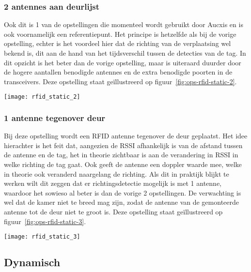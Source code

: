 \subsubsection{2 antennes aan deurlijst}
\begin{minipage}{0.65\textwidth}
Ook dit is 1 van de opstellingen die momenteel wordt gebruikt door Aucxis en is ook voornamelijk een referentiepunt. Het principe is hetzelfde als bij de vorige opstelling, echter is het voordeel hier dat de richting van de verplaatsing wel bekend is, dit aan de hand van het tijdsverschil tussen de detecties van de tag. In dit opzicht is het beter dan de vorige opstelling, maar is uiteraard duurder door de hogere aantallen benodigde antennes en de extra benodigde poorten in de transceivers. Deze opstelling staat geïllustreerd op figuur~\ref{fig:ops-rfid-static-2}.
\end{minipage}
\hfill
\begin{minipage}{0.30\textwidth}
	\texttt{[image: rfid\_static\_2]}
	\label{fig:ops-rfid-static-2}
\end{minipage}

\subsubsection{1 antenne tegenover deur}
\begin{minipage}{0.65\textwidth}
Bij deze opstelling wordt een RFID antenne tegenover de deur geplaatst. Het idee hierachter is het feit dat, aangezien de RSSI afhankelijk is van de afstand tussen de antenne en de tag, het in theorie zichtbaar is aan de verandering in RSSI in welke richting de tag gaat. Ook geeft de antenne een doppler waarde mee, welke in theorie ook veranderd naargelang de richting. Als dit in praktijk blijkt te werken wilt dit zeggen dat er richtingsdetectie mogelijk is met 1 antenne, waardoor het sowieso al beter is dan de vorige 2 opstellingen. De verwachting is wel dat de kamer niet te breed mag zijn, zodat de antenne van de gemonteerde antenne tot de deur niet te groot is. Deze opstelling staat geïllustreerd op figuur~\ref{fig:ops-rfid-static-3}.
\end{minipage}
\hfill
\begin{minipage}{0.30\textwidth}
	\texttt{[image: rfid\_static\_3]}
	\label{fig:ops-rfid-static-3}
\end{minipage}
\subsection{Dynamisch}

